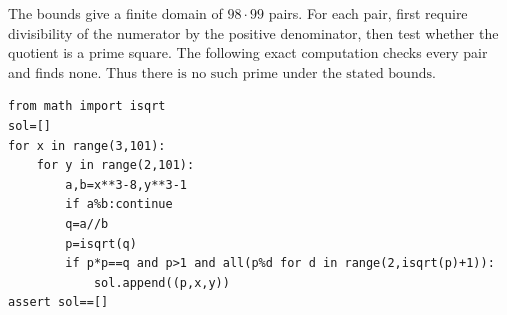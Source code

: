 The bounds give a finite domain of $98\cdot99$ pairs. For each pair, first require divisibility of the numerator by the positive denominator, then test whether the quotient is a prime square. The following exact computation checks every pair and finds none. Thus $\boxed{\text{there is no such prime under the stated bounds}}$.
\begin{verbatim}
from math import isqrt
sol=[]
for x in range(3,101):
    for y in range(2,101):
        a,b=x**3-8,y**3-1
        if a%b:continue
        q=a//b
        p=isqrt(q)
        if p*p==q and p>1 and all(p%d for d in range(2,isqrt(p)+1)):
            sol.append((p,x,y))
assert sol==[]
\end{verbatim}
